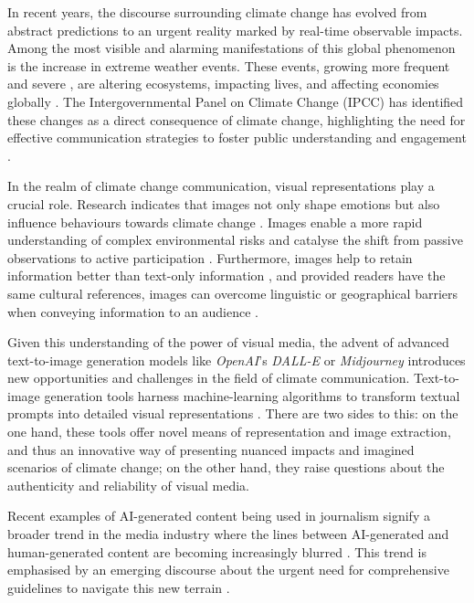 In recent years, the discourse surrounding climate change has evolved from abstract predictions to an urgent reality marked by real-time observable impacts. Among the most visible and alarming manifestations of this global phenomenon is the increase in extreme weather events. These events, growing more frequent and severe \parencite{ipcc2023_wg1_11}, are altering ecosystems, impacting lives, and affecting economies globally \parencite[2460]{ipcc2023_wg2_16}. The Intergovernmental Panel on Climate Change (IPCC) has identified these changes as a direct consequence of climate change, highlighting the need for effective communication strategies to foster public understanding and engagement \parencite{ipcc2023_wg1_1}.

In the realm of climate change communication, visual representations play a crucial role. Research indicates that images not only shape emotions but also influence behaviours towards climate change \parencite{Leiserowitz2006}. Images enable a more rapid understanding of complex environmental risks \parencite{Epstein1994, Joffe2008} and catalyse the shift from passive observations to active participation \parencite{Keib2018}. Furthermore, images help to retain information better than text-only information \parencite{Coleman2009, Graber1990}, and provided readers have the same cultural references, images can overcome linguistic or geographical barriers when conveying information to an audience \parencite{Armfield2013}.

Given this understanding of the power of visual media, the advent of advanced text-to-image generation models like \textit{OpenAI}’s \textit{DALL-E} or \textit{Midjourney} introduces new opportunities and challenges in the field of climate communication. Text-to-image generation tools harness machine-learning algorithms to transform textual prompts into detailed visual representations \parencite{Zhang2023}. There are two sides to this: on the one hand, these tools offer novel means of representation and image extraction, and thus an innovative way of presenting nuanced impacts and imagined scenarios of climate change; on the other hand, they raise questions about the authenticity and reliability of visual media.

Recent examples of AI-generated content being used in journalism signify a broader trend in the media industry where the lines between AI-generated and human-generated content are becoming increasingly blurred \parencite{Henrich2023, Kim2023}. This trend is emphasised by an emerging discourse about the urgent need for comprehensive guidelines to navigate this new terrain \parencite{CouncilOfEurope2023, SwissPressCouncil2023}. 

